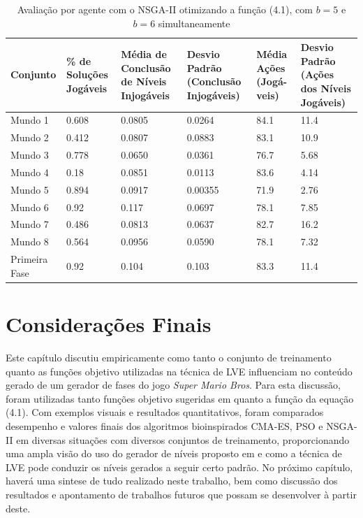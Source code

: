 \begin{table}[ht]
    \centering
    \begin{tabular}{|p{2cm}|p{2cm}|p{2cm}|p{2cm}|p{1cm}|p{2cm}|}
            \hline
            \textbf{Conjunto} & \textbf{\% de Soluções Jogáveis} & \textbf{Média de Conclusão de Níveis Injogáveis} & \textbf{Desvio Padrão (Conclusão Injogáveis)} & \textbf{Média Ações (Jogá- veis)} & \textbf{Desvio Padrão (Ações dos Níveis Jogáveis)} \\
            \hline
        Mundo 1 & 0.608 & 0.0805 & 0.0264 & 84.1 & 11.4 \\
            \hline
        Mundo 2 & 0.412 & 0.0807 & 0.0883 & 83.1 & 10.9 \\
            \hline
        Mundo 3 & 0.778 & 0.0650 & 0.0361 & 76.7 & 5.68 \\
            \hline
        Mundo 4 & 0.18 & 0.0851 & 0.0113 & 83.6 & 4.14 \\
            \hline
        Mundo 5 & 0.894 & 0.0917 & 0.00355 & 71.9 & 2.76 \\
            \hline
        Mundo 6 & 0.92 & 0.117 & 0.0697 & 78.1 & 7.85 \\
            \hline
        Mundo 7 & 0.486 & 0.0813 & 0.0637 & 82.7 & 16.2 \\
            \hline
        Mundo 8 & 0.564 & 0.0956 & 0.0590 & 78.1 & 7.32 \\
            \hline
        Primeira Fase & 0.92 & 0.104 & 0.103 & 83.3 & 11.4 \\
            \hline
    \end{tabular}
    \caption{Avaliação por agente com o NSGA-II otimizando a função (4.1), com $b = 5$ e $b = 6$ simultaneamente}
    \label{tab:nsga_}
\end{table}

\section{Considerações Finais}

Este capítulo discutiu empiricamente como tanto o conjunto de treinamento quanto as funções objetivo utilizadas na técnica de LVE influenciam no conteúdo gerado de um gerador de fases do jogo \textit{Super Mario Bros}. Para esta discussão, foram utilizadas tanto funções objetivo sugeridas em \citep{marioGAN} quanto a função da equação (4.1). Com exemplos visuais e resultados quantitativos, foram comparados desempenho e valores finais dos algoritmos bioinspirados CMA-ES, PSO e NSGA-II em diversas situações com diversos conjuntos de treinamento, proporcionando uma ampla visão do uso do gerador de níveis proposto em \citep{marioGAN} e como a técnica de LVE pode conduzir os níveis gerados a seguir certo padrão. No próximo capítulo, haverá uma sintese de tudo realizado neste trabalho, bem como discussão dos resultados e apontamento de trabalhos futuros que possam se desenvolver à partir deste.
